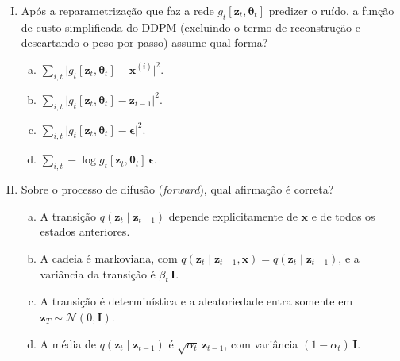 \documentclass{dlproblemset}
\newcommand{\thetav}{\boldsymbol{\theta}}
\begin{document}
\begin{enumerate}[I)]
\item Após a reparametrização que faz a rede $g_t[\mathbf{z}_t,\thetav_t]$ predizer o ruído, a função de custo simplificada do DDPM (excluindo o termo de reconstrução e descartando o peso por passo) assume qual forma?
\begin{enumerate}[(a)]
    \item $\sum_{i,t} \big|g_t[\mathbf{z}_t,\thetav_t] - \mathbf{x}^{(i)}\big|^{2}$.
    \item $\sum_{i,t} \big|g_t[\mathbf{z}_t,\thetav_t] - \mathbf{z}_{t-1}\big|^{2}$.
    \item $\sum_{i,t} \big|g_t[\mathbf{z}_t,\thetav_t] - \boldsymbol{\epsilon}\big|^{2}$.
    \item $\sum_{i,t} -\log g_t[\mathbf{z}_t,\thetav_t]\,\boldsymbol{\epsilon}$.
\end{enumerate}

\item Sobre o processo de difusão (\textit{forward}), qual afirmação é correta?
\begin{enumerate}[(a)]
    \item A transição $q(\mathbf{z}_t \mid \mathbf{z}_{t-1})$ depende explicitamente de $\mathbf{x}$ e de todos os estados anteriores.
    \item A cadeia é markoviana, com $q(\mathbf{z}_t \mid \mathbf{z}_{t-1}, \mathbf{x}) = q(\mathbf{z}_t \mid \mathbf{z}_{t-1})$, e a variância da transição é $\beta_t\,\mathbf{I}$.
    \item A transição é determinística e a aleatoriedade entra somente em $\mathbf{z}_T \sim \mathcal{N}(0,\mathbf{I})$.
    \item A média de $q(\mathbf{z}_t \mid \mathbf{z}_{t-1})$ é $\sqrt{\alpha_t}\, \mathbf{z}_{t-1}$, com variância $(1 - \alpha_t)\,\mathbf{I}$.
\end{enumerate}


\end{enumerate}
\end{document}
